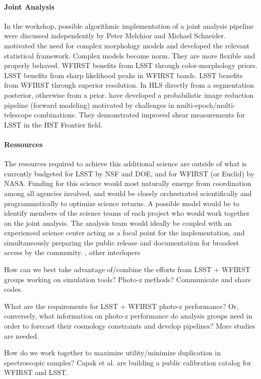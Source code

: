 \paragraph{Joint Analysis} In the workshop, possible algorithmic implementation of a joint analysis pipeline were discussed independently by Peter Melchior and Michael Schneider. \citet{Melchior:2016asy} motivated the need for complex morphology models and developed the relevant statistical framework. Complex models become norm. They are more flexible and properly behaved. WFIRST benefits from LSST through color-morphology priors. LSST benefits from sharp likelihood peaks in WFIRST bands. LSST benefits from WFIRST through superior resolution. In HLS directly from a segmentation posterior, otherwise from a prior. \citet{Schneider:2014rha} have developed a probabilistic image reduction pipeline (forward modeling) motivated by challenges in multi-epoch/multi-telescope combinations. They demonstrated improved shear measurements for LSST in the HST Frontier field. 

\paragraph{Ressources} The resources required to achieve this additional science are outside of what is currently budgeted for LSST by NSF and DOE, and for WFIRST (or Euclid) by NASA. Funding for this science would most naturally emerge from coordination among all agencies involved, and would be closely orchestrated scientifically and programmatically to optimize science returns. A possible model would be to identify members of the science teams of each project who would work together on the joint analysis. The analysis team would ideally be coupled with an experienced science center acting as a focal point for the implementation, and simultaneously preparing the public release and documentation for broadest access by the community.
, other interlopers


How can we best take advantage of/combine the efforts from LSST + WFIRST groups working on simulation tools? Photo-z methods?
Communicate and share codes.

What are the requirements for LSST + WFIRST photo-z performance? Or, conversely, what information on photo-z performance do analysis groups need in order to forecast their cosmology constraints and develop pipelines?
More studies are needed.

How do we work together to maximize utility/minimize duplication in spectroscopic samples?
Capak et al. are building a public calibration catalog for WFIRST and LSST.

